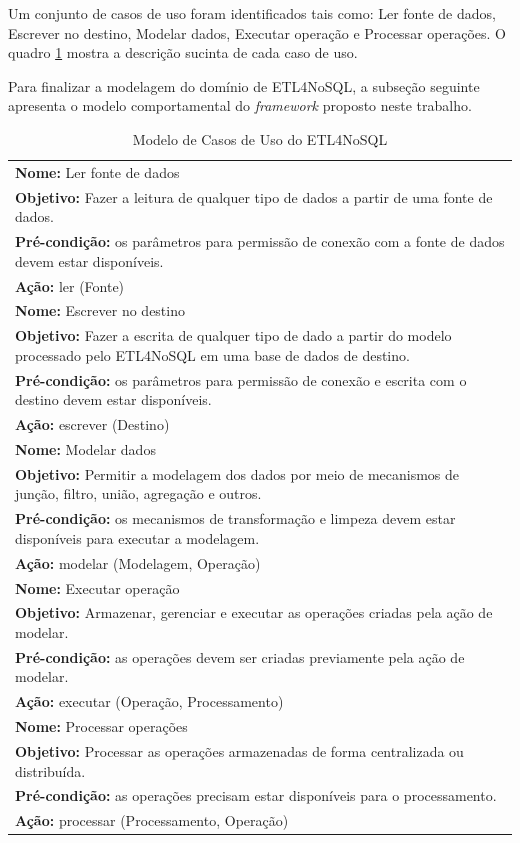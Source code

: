 Um conjunto de casos de uso foram identificados tais como: Ler fonte de dados, Escrever no destino, Modelar dados, Executar operação e Processar operações. O quadro \ref{casosdeuso} mostra a descrição sucinta de cada caso de uso. 

Para finalizar a modelagem do domínio de ETL4NoSQL, a subseção seguinte apresenta o modelo comportamental do \textit{framework} proposto neste trabalho.



\begin{table}[h!]
	\centering
	\caption{Modelo de Casos de Uso do ETL4NoSQL}
	\label{casosdeuso}
	\begin{tabular}{|p{14cm}|}
		\hline
			\textbf{Nome:} Ler fonte de dados\\ 
			\textbf{Objetivo:} Fazer a leitura de qualquer tipo de dados a partir de uma fonte de dados.\\ 
			\textbf{Pré-condição:} os parâmetros para permissão de conexão com a fonte de dados devem estar disponíveis.\\ 
			\textbf{Ação:} ler (Fonte)\\ 
		\hline
			\textbf{Nome:} Escrever no destino\\ 
			\textbf{Objetivo:} Fazer a escrita de qualquer tipo de dado a partir do modelo processado pelo ETL4NoSQL em uma base  de dados de destino.\\ 
			\textbf{Pré-condição:} os parâmetros para permissão de conexão e escrita com o destino devem estar disponíveis.\\ 
			\textbf{Ação:} escrever (Destino)  \\ 
	\hline
			\textbf{Nome:} Modelar dados\\ 
			\textbf{Objetivo:} Permitir a modelagem dos dados por meio de mecanismos de junção, filtro, união, agregação e outros. \\
			 \textbf{Pré-condição:} os mecanismos de transformação e limpeza devem estar disponíveis para executar a modelagem.\\ 
			 \textbf{Ação:} modelar (Modelagem, Operação)\\ 
	 \hline
	 		\textbf{Nome:} Executar operação\\ 
	 		\textbf{Objetivo:} Armazenar, gerenciar e executar as operações criadas pela ação de modelar.\\
	 		\textbf{Pré-condição:} as operações devem ser criadas previamente pela ação de modelar.\\ 
	 		\textbf{Ação:} executar (Operação, Processamento)\\ 
	 \hline
	 	\textbf{Nome:} Processar operações\\ 
	 	\textbf{Objetivo:} Processar as operações armazenadas de forma centralizada ou distribuída.\\
	 	\textbf{Pré-condição:} as operações precisam estar disponíveis para o processamento.\\ 
	 	\textbf{Ação:} processar (Processamento, Operação)\\ 
	 \hline
	 
	\end{tabular}
\end{table}

